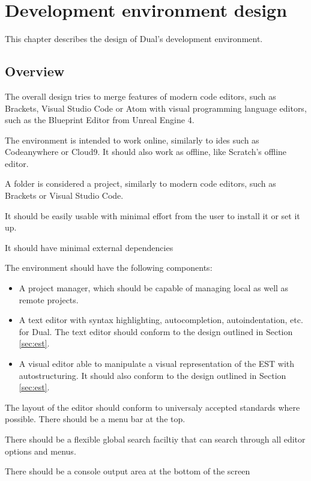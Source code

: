 \chapter{Development environment design}\label{chap:editor}
This chapter describes the design of Dual's development environment.

\section{Overview}
The overall design tries to merge features of modern code editors, such as Brackets\cite{brackets_site}, Visual Studio Code\cite{vscode_site} or Atom\cite{atom_site} with visual programming language editors, such as the Blueprint Editor from Unreal Engine 4\cite{blueprint_editor}.

The environment is intended to work online, similarly to \acrlong{ide}s such as Codeanywhere\cite{codeanywhere_website} or Cloud9\cite{c9_website}. It should also work as offline, like Scratch's offline editor\cite{scratch_offline}.




A folder is considered a project, similarly to modern code editors, such as Brackets or Visual Studio Code.

It should be easily usable with minimal effort from the user to install it or set it up.

It should have minimal external dependencies

The environment should have the following components:
\begin{itemize}
\item A project manager, which should be capable of managing local as well as remote projects.
\item A text editor with syntax highlighting, autocompletion, autoindentation, etc. for Dual. The text editor should conform to the design outlined in Section \ref{sec:est}.
\item A visual editor able to manipulate a visual representation of the EST  with autostructuring. It should also conform to the design outlined in Section \ref{sec:est}.
\end{itemize}

The layout of the editor should conform to universaly accepted standards where possible. There should be a menu bar at the top.

There should be a flexible global search faciltiy that can search through all editor options and menus.

There should be a console output area at the bottom of the screen

